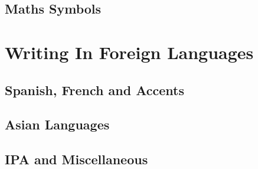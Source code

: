 \documentclass[12pt,a4paper]{article}
\begin{document}
\subsection{Maths Symbols}

\newpage
\section{Writing In Foreign Languages}

\subsection{Spanish, French and Accents}

\subsection{Asian Languages}

\subsection{IPA and Miscellaneous}




\end{document}
